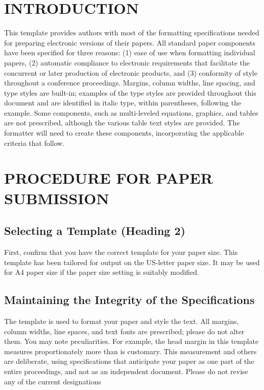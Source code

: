 \documentclass[letterpaper, 10 pt, conference]{ieeeconf}  %
\begin{document}
	
	\section{INTRODUCTION}
	
	This template provides authors with most of the formatting specifications needed for preparing electronic versions of their papers. All standard paper components have been specified for three reasons: (1) ease of use when formatting individual papers, (2) automatic compliance to electronic requirements that facilitate the concurrent or later production of electronic products, and (3) conformity of style throughout a conference proceedings. Margins, column widths, line spacing, and type styles are built-in; examples of the type styles are provided throughout this document and are identified in italic type, within parentheses, following the example. Some components, such as multi-leveled equations, graphics, and tables are not prescribed, although the various table text styles are provided. The formatter will need to create these components, incorporating the applicable criteria that follow.
	
	\section{PROCEDURE FOR PAPER SUBMISSION}
	
	\subsection{Selecting a Template (Heading 2)}
	
	First, confirm that you have the correct template for your paper size. This template has been tailored for output on the US-letter paper size. 
	It may be used for A4 paper size if the paper size setting is suitably modified.
	
	\subsection{Maintaining the Integrity of the Specifications}
	
	The template is used to format your paper and style the text. All margins, column widths, line spaces, and text fonts are prescribed; please do not alter them. You may note peculiarities. For example, the head margin in this template measures proportionately more than is customary. This measurement and others are deliberate, using specifications that anticipate your paper as one part of the entire proceedings, and not as an independent document. Please do not revise any of the current designations
	
\end{document}
